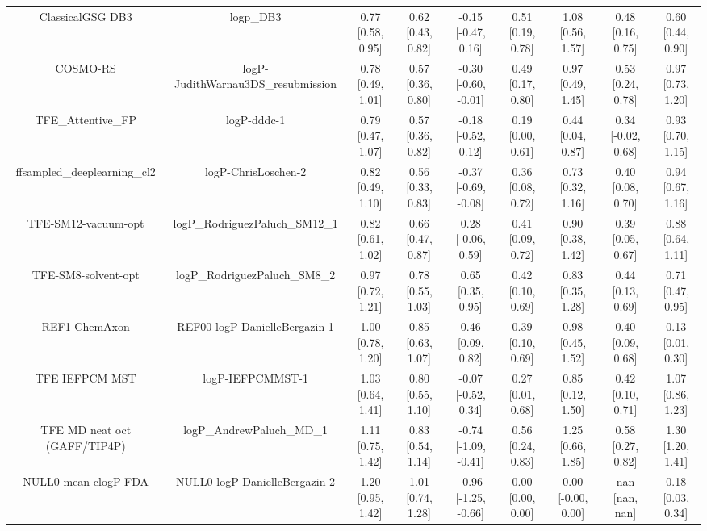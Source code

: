 \documentclass{article}
\begin{document}
\begin{center}
\begin{longtable}{|ccccccccc|}
             ClassicalGSG DB3 &                                      logp\_DB3 &  0.77 [0.58, 0.95] &  0.62 [0.43, 0.82] &   -0.15 [-0.47, 0.16] &  0.51 [0.19, 0.78] &     1.08 [0.56, 1.57] &     0.48 [0.16, 0.75] &     0.60 [0.44, 0.90] \\
                     COSMO-RS &             logP-JudithWarnau3DS\_resubmission &  0.78 [0.49, 1.01] &  0.57 [0.36, 0.80] &  -0.30 [-0.60, -0.01] &  0.49 [0.17, 0.80] &     0.97 [0.49, 1.45] &     0.53 [0.24, 0.78] &     0.97 [0.73, 1.20] \\
             TFE_Attentive_FP &                                    logP-dddc-1 &  0.79 [0.47, 1.07] &  0.57 [0.36, 0.82] &   -0.18 [-0.52, 0.12] &  0.19 [0.00, 0.61] &     0.44 [0.04, 0.87] &    0.34 [-0.02, 0.68] &     0.93 [0.70, 1.15] \\
   ffsampled_deeplearning_cl2 &                            logP-ChrisLoschen-2 &  0.82 [0.49, 1.10] &  0.56 [0.33, 0.83] &  -0.37 [-0.69, -0.08] &  0.36 [0.08, 0.72] &     0.73 [0.32, 1.16] &     0.40 [0.08, 0.70] &     0.94 [0.67, 1.16] \\
          TFE-SM12-vacuum-opt &                 logP\_RodriguezPaluch\_SM12\_1 &  0.82 [0.61, 1.02] &  0.66 [0.47, 0.87] &    0.28 [-0.06, 0.59] &  0.41 [0.09, 0.72] &     0.90 [0.38, 1.42] &     0.39 [0.05, 0.67] &     0.88 [0.64, 1.11] \\
          TFE-SM8-solvent-opt &                  logP\_RodriguezPaluch\_SM8\_2 &  0.97 [0.72, 1.21] &  0.78 [0.55, 1.03] &     0.65 [0.35, 0.95] &  0.42 [0.10, 0.69] &     0.83 [0.35, 1.28] &     0.44 [0.13, 0.69] &     0.71 [0.47, 0.95] \\
                REF1 ChemAxon &                  REF00-logP-DanielleBergazin-1 &  1.00 [0.78, 1.20] &  0.85 [0.63, 1.07] &     0.46 [0.09, 0.82] &  0.39 [0.10, 0.69] &     0.98 [0.45, 1.52] &     0.40 [0.09, 0.68] &     0.13 [0.01, 0.30] \\
               TFE IEFPCM MST &                               logP-IEFPCMMST-1 &  1.03 [0.64, 1.41] &  0.80 [0.55, 1.10] &   -0.07 [-0.52, 0.34] &  0.27 [0.01, 0.68] &     0.85 [0.12, 1.50] &     0.42 [0.10, 0.71] &     1.07 [0.86, 1.23] \\
 TFE MD neat oct (GAFF/TIP4P) &                      logP\_AndrewPaluch\_MD\_1 &  1.11 [0.75, 1.42] &  0.83 [0.54, 1.14] &  -0.74 [-1.09, -0.41] &  0.56 [0.24, 0.83] &     1.25 [0.66, 1.85] &     0.58 [0.27, 0.82] &     1.30 [1.20, 1.41] \\
         NULL0 mean clogP FDA &                  NULL0-logP-DanielleBergazin-2 &  1.20 [0.95, 1.42] &  1.01 [0.74, 1.28] &  -0.96 [-1.25, -0.66] &  0.00 [0.00, 0.00] &    0.00 [-0.00, 0.00] &        nan [nan, nan] &     0.18 [0.03, 0.34] \\

\end{longtable}
\end{center}
\end{document}
